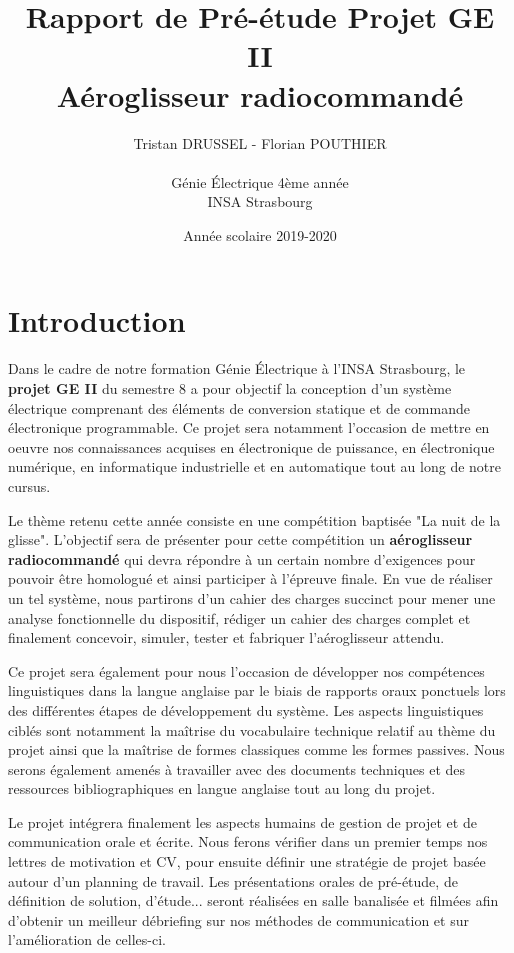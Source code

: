 \documentclass[a4paper,12pt]{report}
\title{Rapport de Pré-étude Projet GE II\\Aéroglisseur radiocommandé}
\author{Tristan DRUSSEL - Florian POUTHIER \\ \\ Génie Électrique 4ème année\\ INSA Strasbourg}
\date{Année scolaire 2019-2020}
\begin{document}
	\begin{titlepage}
		\maketitle
	\end{titlepage}
	\tableofcontents
	\newpage
	
	\section{Introduction}
	
	Dans le cadre de notre formation Génie Électrique à l'INSA Strasbourg, le \textbf{projet GE II} du semestre 8 a pour objectif la conception d'un système électrique comprenant des éléments de conversion statique et de commande électronique programmable. Ce projet sera notamment l'occasion de mettre en oeuvre nos connaissances acquises en électronique de puissance, en électronique numérique, en informatique industrielle et en automatique tout au long de notre cursus. 
	
	Le thème retenu cette année consiste en une compétition baptisée "La nuit de la glisse". L'objectif sera de présenter pour cette compétition un \textbf{aéroglisseur radiocommandé} qui devra répondre à un certain nombre d'exigences pour pouvoir être homologué et ainsi participer à l'épreuve finale. En vue de réaliser un tel système, nous partirons d'un cahier des charges succinct pour mener une analyse fonctionnelle du dispositif, rédiger un cahier des charges complet et finalement concevoir, simuler, tester et fabriquer l'aéroglisseur attendu.
	
	Ce projet sera également pour nous l'occasion de développer nos compétences linguistiques dans la langue anglaise par le biais de rapports oraux ponctuels lors des différentes étapes de développement du système. Les aspects linguistiques ciblés sont notamment la maîtrise du vocabulaire technique relatif au thème du projet ainsi que la maîtrise de formes classiques comme les formes passives. Nous serons également amenés à travailler avec des documents techniques et des ressources bibliographiques en langue anglaise tout au long du projet.
	
	Le projet intégrera finalement les aspects humains de gestion de projet et de communication orale et écrite. Nous ferons vérifier dans un premier temps nos lettres de motivation et CV, pour ensuite définir une stratégie de projet basée autour d'un planning de travail. Les présentations orales de pré-étude, de définition de solution, d'étude... seront réalisées en salle banalisée et filmées afin d'obtenir un meilleur débriefing sur nos méthodes de communication et sur l'amélioration de celles-ci.
	
\end{document}
